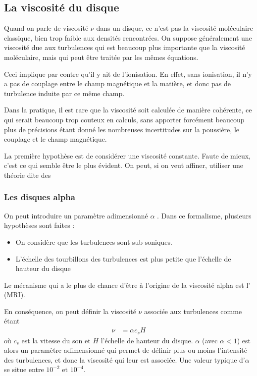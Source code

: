 \subsection{La viscosité du disque} %
Quand on parle de viscosité $\nu$ dans un disque, ce n'est pas la viscosité moléculaire classique, bien trop faible aux densités rencontrées. On suppose généralement une viscosité due aux turbulences qui est beaucoup plus importante que la viscosité moléculaire, mais qui peut être traitée par les mêmes équations. 

Ceci implique par contre qu'il y ait de l'ionisation. En effet, sans ionisation, il n'y a pas de couplage entre le champ magnétique et la matière, et donc pas de turbulence induite par ce même champ. 

Dans la pratique, il est rare que la viscosité soit calculée de manière cohérente, ce qui serait beaucoup trop couteux en calculs, sans apporter forcément beaucoup plus de précisions étant donné les nombreuses incertitudes sur la poussière, le couplage et le champ magnétique. 

La première hypothèse est de considérer une viscosité constante. Faute de mieux, c'est ce qui semble être le plus évident. On peut, si on veut affiner, utiliser une théorie dite des 

\subsubsection{Les disques alpha}
On peut introduire un paramètre adimensionné $\alpha$ \citep{shakura1989black}. Dans ce formalisme, plusieurs hypothèses sont faites : 
\begin{itemize}
\item On considère que les turbulences sont sub-soniques.
\item L'échelle des tourbillons des turbulences est plus petite que l'échelle de hauteur du disque
\end{itemize}
Le mécanisme qui a le plus de chance d'être à l'origine de la viscosité alpha est l' (MRI). 

\bigskip

En conséquence, on peut définir la viscosité $\nu$ associée aux turbulences comme étant 
\begin{align}
\nu &= \alpha c_s H
\end{align}
où $c_s$ est la vitesse du son et $H$ l'échelle de hauteur du disque. $\alpha$ (avec $\alpha < 1$) est alors un paramètre adimensionné qui permet de définir plus ou moins l'intensité des turbulences, et donc la viscosité qui leur est associée. Une valeur typique d'$\alpha$ se situe entre $10^{-2}$ et $10^{-4}$.

